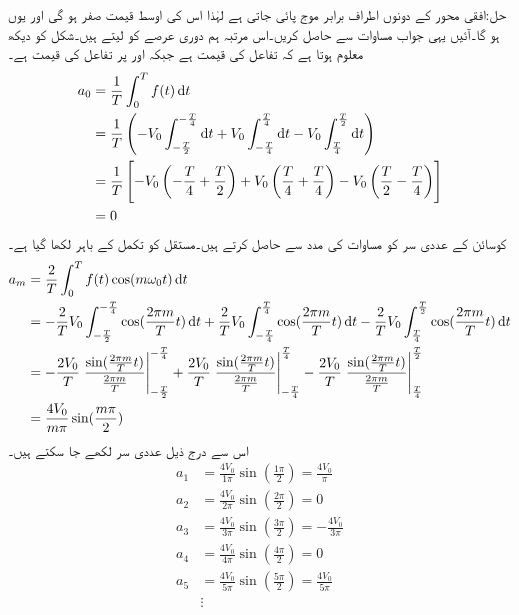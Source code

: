 حل:افقی محور کے دونوں اطراف برابر موج پائی جاتی ہے لہٰذا اس کی اوسط قیمت صفر ہو گی اور یوں  ہو گا۔آئیں یہی جواب مساوات  سے حاصل کریں۔اس مرتبہ ہم دوری عرصے کو  لیتے ہیں۔شکل کو دیکھ معلوم ہوتا ہے کہ  تفاعل کی قیمت  ہے جبکہ
  اور  پر تفاعل کی قیمت  ہے۔
\begin{align*}
a_0&=\frac{1}{T}\int_0^T f(t) \dif t\\
&=\frac{1}{T} \left(-V_0 \int_{-\frac{T}{2}}^{-\frac{T}{4}} \dif t+V_0\int_{-\frac{T}{4}}^{\frac{T}{4}}\dif t -V_0\int_{\frac{T}{4}}^{\frac{T}{2}} \dif t\right)\\
&=\frac{1}{T}\left[-V_0\left(-\frac{T}{4}+\frac{T}{2}\right)+V_0\left(\frac{T}{4}+\frac{T}{4}\right)-V_0\left(\frac{T}{2}-\frac{T}{4}\right)\right]\\
&=0
\end{align*}
کوسائن کے عددی سر  کو مساوات  کی مدد سے حاصل کرتے ہیں۔مستقل  کو تکمل کے باہر لکھا گیا ہے۔
\begin{align*}
a_m&=\frac{2}{T}\int_0^T f(t)\cos(m\omega_0 t) \dif t\\
&=-\frac{2}{T}V_0\int_{-\frac{T}{2}}^{-\frac{T}{4}} \cos (\frac{2\pi m}{T} t) \dif t+\frac{2}{T}V_0\int_{-\frac{T}{4}}^{\frac{T}{4}} \cos (\frac{2\pi m}{T} t) \dif t-\frac{2}{T}V_0\int_{\frac{T}{4}}^{\frac{T}{2}} \cos (\frac{2\pi m}{T} t) \dif t\\
&=-\frac{2V_0}{T}\left.\frac{\sin (\frac{2\pi m}{T} t)}{\frac{2\pi m}{T}}\right|_{-\frac{T}{2}}^{-\frac{T}{4}}+\frac{2V_0}{T}\left.\frac{\sin (\frac{2\pi m}{T} t)}{\frac{2\pi m}{T}}\right|_{-\frac{T}{4}}^{\frac{T}{4}}-\frac{2V_0}{T}\left.\frac{\sin (\frac{2\pi m}{T} t)}{\frac{2\pi m}{T}}\right|_{\frac{T}{4}}^{\frac{T}{2}}\\
&=\frac{4V_0}{m\pi} \sin(\frac{m\pi}{2})
\end{align*}
اس سے درج ذیل عددی سر لکھے جا سکتے ہیں۔
\begin{align*}
a_1&=\frac{4V_0}{1\pi} \sin(\frac{1\pi}{2})=\frac{4V_0}{\pi}\\
a_2&=\frac{4V_0}{2\pi} \sin(\frac{2\pi}{2})=0\\
a_3&=\frac{4V_0}{3\pi} \sin(\frac{3\pi}{2})=-\frac{4V_0}{3\pi}\\
a_4&=\frac{4V_0}{4\pi} \sin(\frac{4\pi}{2})=0\\
a_5&=\frac{4V_0}{5\pi} \sin(\frac{5\pi}{2})=\frac{4V_0}{5\pi}\\
&\vdots
\end{align*}
